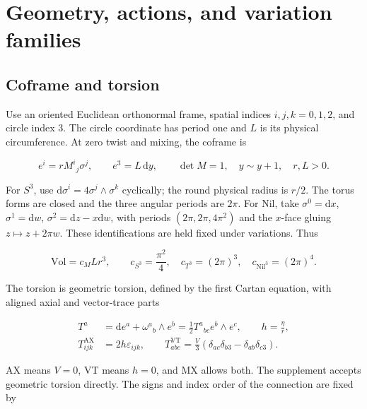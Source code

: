 \section{Geometry, actions, and variation families}

\subsection{Coframe and torsion}

Use an oriented Euclidean orthonormal frame, spatial indices $i,j,k=0,1,2$, and circle index $3$. The circle coordinate has period one and $L$ is its physical circumference. At zero twist and mixing, the coframe is

\begin{equation}\tag{G-01}\label{eq:G-01}
e^i=r M^i{}_j\sigma^j,\qquad e^3=L\,\mathrm{d}y,\qquad
\det M=1,\quad y\sim y+1,\quad r,L>0.
\end{equation}

For $S^3$, use $\mathrm{d}\sigma^i=4\sigma^j\wedge\sigma^k$ cyclically; the round physical radius is $r/2$. The torus forms are closed and the three angular periods are $2\pi$. For Nil, take $\sigma^0=\mathrm{d}x$, $\sigma^1=\mathrm{d}w$, $\sigma^2=\mathrm{d}z-x\mathrm{d}w$, with periods $(2\pi,2\pi,4\pi^2)$ and the $x$-face gluing $z\mapsto z+2\pi w$. These identifications are held fixed under variations. Thus

\begin{equation}\tag{G-02}\label{eq:G-02}
\mathrm{Vol}=c_M Lr^3,\qquad
c_{S^3}=\frac{\pi^2}{4},\quad c_{T^3}=(2\pi)^3,\quad
c_{\mathrm{Nil}^3}=(2\pi)^4.
\end{equation}

The torsion is geometric torsion, defined by the first Cartan equation, with aligned axial and vector-trace parts

\begin{equation}\tag{G-03}\label{eq:G-03}
\begin{aligned}
T^a&=\mathrm{d}e^a+\omega^a{}_b\wedge e^b
=\frac12 T^a{}_{bc}e^b\wedge e^c,\qquad h=\frac{\eta}{r},\\
T^{\mathrm{AX}}_{ijk}&=2h\varepsilon_{ijk},\qquad
T^{\mathrm{VT}}_{abc}=\frac{V}{3}
(\delta_{ac}\delta_{b3}-\delta_{ab}\delta_{c3}).
\end{aligned}
\end{equation}

AX means $V=0$, VT means $h=0$, and MX allows both. The supplement accepts geometric torsion directly. The signs and index order of the connection are fixed by

